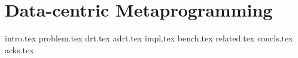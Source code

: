 \chapter{Data-centric Metaprogramming}

{intro.tex}
{problem.tex}
{drt.tex}
{adrt.tex}
{impl.tex}
{bench.tex}
{related.tex}
{concls.tex}
{acks.tex}
